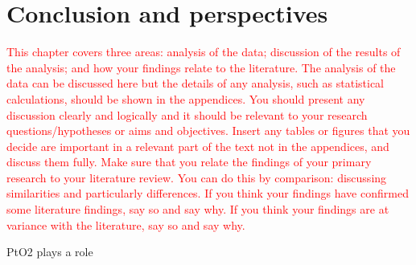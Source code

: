 \section{Conclusion and perspectives}

\textcolor{red}{This chapter covers three areas: analysis of the data; discussion of the results of the analysis; and how your findings relate to the literature. The analysis of the data can be discussed here but the details of any analysis, such as statistical calculations, should be shown in the appendices. You should present any discussion clearly and logically and it should be relevant to your research questions/hypotheses or aims and objectives. Insert any tables or figures that you decide are important in a relevant part of the text not in the appendices, and discuss them fully. Make sure that you relate the findings of your primary research to your literature review. You can do this by comparison: discussing similarities and particularly differences. If you think your findings have confirmed some literature findings, say so and say why. If you think your findings are at variance with the literature, say so and say why.}

PtO2 plays a role \cite{McCabe1986, HANNEVOLD2005}